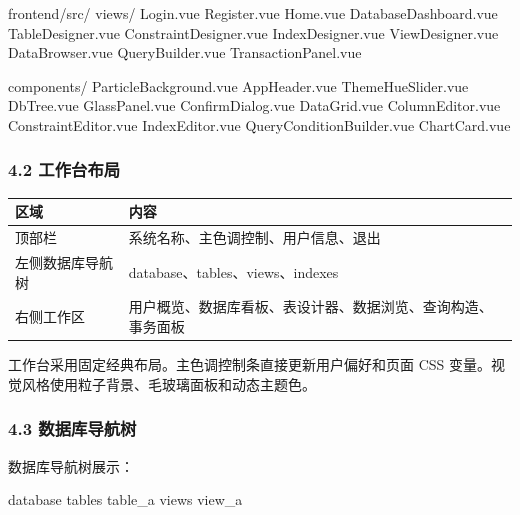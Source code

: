 \documentclass[
  a4paper,
  UTF8]{ctexart}
\newenvironment{Shaded}{}{}
\newcommand{\NormalTok}[1]{#1}
\begin{document}
\begin{Shaded}
\begin{Highlighting}[]
\NormalTok{frontend/src/}
\NormalTok{  views/}
\NormalTok{    Login.vue}
\NormalTok{    Register.vue}
\NormalTok{    Home.vue}
\NormalTok{    DatabaseDashboard.vue}
\NormalTok{    TableDesigner.vue}
\NormalTok{    ConstraintDesigner.vue}
\NormalTok{    IndexDesigner.vue}
\NormalTok{    ViewDesigner.vue}
\NormalTok{    DataBrowser.vue}
\NormalTok{    QueryBuilder.vue}
\NormalTok{    TransactionPanel.vue}

\NormalTok{  components/}
\NormalTok{    ParticleBackground.vue}
\NormalTok{    AppHeader.vue}
\NormalTok{    ThemeHueSlider.vue}
\NormalTok{    DbTree.vue}
\NormalTok{    GlassPanel.vue}
\NormalTok{    ConfirmDialog.vue}
\NormalTok{    DataGrid.vue}
\NormalTok{    ColumnEditor.vue}
\NormalTok{    ConstraintEditor.vue}
\NormalTok{    IndexEditor.vue}
\NormalTok{    QueryConditionBuilder.vue}
\NormalTok{    ChartCard.vue}
\end{Highlighting}
\end{Shaded}

\hypertarget{ux5de5ux4f5cux53f0ux5e03ux5c40}{%
\subsubsection{4.2 工作台布局}\label{ux5de5ux4f5cux53f0ux5e03ux5c40}}

\begin{longtable}[]{@{}ll@{}}
\toprule
区域 & 内容 \\
\midrule
\endhead
顶部栏 & 系统名称、主色调控制、用户信息、退出 \\
左侧数据库导航树 & database、tables、views、indexes \\
右侧工作区 &
用户概览、数据库看板、表设计器、数据浏览、查询构造、事务面板 \\
\bottomrule
\end{longtable}

工作台采用固定经典布局。主色调控制条直接更新用户偏好和页面 CSS
变量。视觉风格使用粒子背景、毛玻璃面板和动态主题色。

\hypertarget{ux6570ux636eux5e93ux5bfcux822aux6811}{%
\subsubsection{4.3
数据库导航树}\label{ux6570ux636eux5e93ux5bfcux822aux6811}}

数据库导航树展示：

\begin{Shaded}
\begin{Highlighting}[]
\NormalTok{database}
\NormalTok{  tables}
\NormalTok{    table\_a}
\NormalTok{  views}
\NormalTok{    view\_a}
\end{Highlighting}
\end{Shaded}
\end{document}

